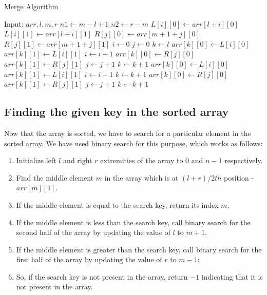 \documentclass[letterpaper, 11 pt, conference]{ieeeconf}  %
\begin{document}
\begin{algorithm}
\caption{Merge Algorithm}\label{alg:merge}
\begin{algorithmic}
\State Input: $arr, l, m, r$
\State $n1 \gets m-l+1$
\State $n2 \gets r-m$
    \State $L[i][0] \gets arr[l+i][0]$
    \State $L[i][1] \gets arr[l+i][1]$
\EndFor
{}
    \State $R[j][0] \gets arr[m+1+j][0]$
    \State $R[j][1] \gets arr[m+1+j][1]$
\EndFor
\State $i \gets 0$
\State $j \gets 0$
\State $k \gets l$
        \State $arr[k][0] \gets L[i][0]$
        \State $arr[k][1] \gets L[i][1]$
        \State $i \gets i+1$
    \Else
        \State $arr[k][0] \gets R[j][0]$
        \State $arr[k][1] \gets R[j][1]$
        \State $j \gets j+1$
    \EndIf
    \State $k\gets k+1$
\EndWhile
{}
    \State $arr[k][0] \gets L[i][0]$
    \State $arr[k][1] \gets L[i][1]$
    \State $i \gets i+1$
    \State $k \gets k+1$
\EndWhile
{}
    \State $arr[k][0] \gets R[j][0]$
    \State $arr[k][1] \gets R[j][1]$
    \State $j \gets j+1$
    \State $k \gets k+1$
\EndWhile
\end{algorithmic}
\end{algorithm}

\subsection{Finding the given key in the sorted array}

Now that the array is sorted, we have to search for a particular element in the sorted array. We have used binary search for this purpose, which works as follows:

\begin{enumerate}
\item Initialize left $l$ and right $r$ extremities of the array to $0$ and $n-1$ respectively.
\item Find the middle element $m$ in the array which is at $(l+r)/2 th$ position - $arr[m][1]$.
\item If the middle element is equal to the search key, return its index $m$.
\item If the middle element is less than the search key, call binary search for the second half of the array by updating the value of $l$ to $m+1$.
\item If the middle element is greater than the search key, call binary search for the first half of the array by updating the value of $r$ to $m - 1$;
\item So, if the search key is not present in the array, return $-1$ indicating that it is not present in the array.
\end{enumerate}
\end{document}

